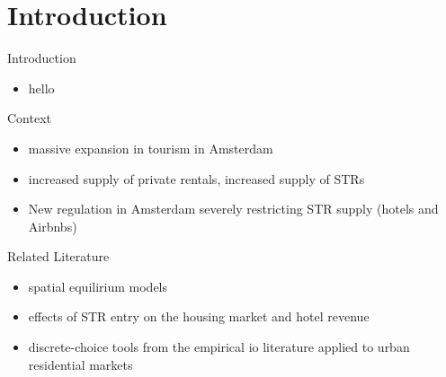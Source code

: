 



\begin{frame}[plain]
\titlepage
\note{
	\begin{itemize}
	\end{itemize}
}
\end{frame}

\section{Introduction}
\begin{frame}{Introduction}
	\begin{itemize}
		\item hello
	\end{itemize}
\end{frame}

\begin{frame}{Context}
	\begin{itemize}
        \item massive expansion in tourism in Amsterdam
		\item increased supply of private rentals, increased supply of STRs
        \item New regulation in Amsterdam severely restricting STR supply (hotels and Airbnbs)
       
	\end{itemize}
\end{frame}

\begin{frame}{Related Literature}
	\begin{itemize}
		\item spatial equilirium models
        \item effects of STR entry on the housing market and hotel revenue
        \item discrete-choice tools from the empirical io literature applied to urban residential markets
	\end{itemize}
\end{frame}

